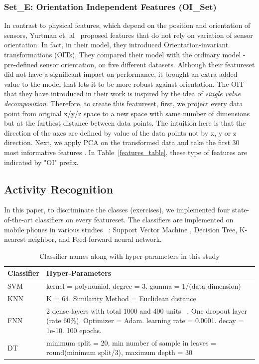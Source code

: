 \documentclass[journal,article,submit,moreauthors,pdftex]{Definitions/mdpi}
\begin{document}
\subsubsection{Set\_E: Orientation Independent Features (OI\_Set)}
In contrast to physical features, which depend on the position and orientation of sensors, Yurtman et. al~\cite{yurtman2017activity} proposed features that do not rely on variation of sensor orientation. In fact, in their model, they introduced Orientation-invariant transformations (OITs). They compared their model with the ordinary model - pre-defined sensor orientation, on five different datasets. Although their featureset did not have a significant impact on performance, it brought an extra added value to the model that lets it to be more robust against orientation. The OIT that they have introduced in their work is inspired by the idea of \textit{single value decomposition}\cite{moon2000mathematical}. Therefore, to create this featureset, first, we project every data point from original x/y/z space to a new space with same number of dimensions but at the farthest distance between data points. The intuition here is that the direction of the axes are defined by value of the data points not by x, y or z direction. Next, we apply PCA on the transformed data and take the first 30 most informative features \cite{janidarmian2017comprehensive}. In Table~\ref{features_table}, these type of features  are indicated by "OI" prefix.

\subsection{Activity Recognition}
\label{method}
In this paper, to discriminate the classes (exercises), we implemented four state-of-the-art classifiers on every featureset. The classifiers are implemented on mobile phones in various studies ~\cite{morris2014recofit,baldominos2019comparison,rosati2018comparison}: Support Vector Machine , Decision Tree, K-nearest neighbor, and Feed-forward neural network. 
\begin{table}[H]
	\caption{Classifier names along with hyper-parameters in this study}
	\centering
	\begin{tabular}{p{2cm}p{7.7cm}}
		\toprule
		\textbf{Classifier} & \textbf{Hyper-Parameters} \\
		\midrule
		SVM &  kernel = polynomial. degree = 3. gamma = 1/(data dimension)  \\
		\midrule
		KNN & K = 64. Similarity Method = Euclidean distance  \\
		\midrule
		FNN & { 2 dense layers with total 1000 and 400 units ~\cite{nair2010rectified}. One dropout layer (rate 60\%). Optimizer = Adam. learning rate = 0.0001. decay = 1e-10. 100 epochs.}\\
		\midrule
		DT & minimum split = 20, min number of sample in leaves = round(minimum split/3), maximum depth = 30 \\
		\bottomrule
	\end{tabular}
	\label{classifier_hyper_parameter}
\end{table}
\end{document}
